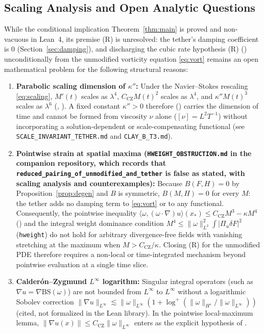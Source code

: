 \documentclass[11pt,a4paper]{article}
\theoremstyle{plain}
\theoremstyle{definition}
\theoremstyle{remark}
\newcommand{\CZ}{C_{\mathrm{CZ}}}
\begin{document}
\subsection{Scaling Analysis and Open Analytic Questions}\label{sec:obstruction}\label{sec:open}
While the conditional implication Theorem~\ref{thm:main} is proved and non-vacuous in Lean~4, its premise (R) is unresolved: the tether's damping coefficient is $0$ (Section~\ref{sec:damping}), and discharging the cubic rate hypothesis (R) () unconditionally from the unmodified vorticity equation \eqref{eq:vort} remains an open mathematical problem for the following structural reasons:
\begin{enumerate}
\item \textbf{Parabolic scaling dimension of $\kappa''$:} Under the Navier--Stokes rescaling \eqref{eq:scaling}, $M'(t)$ scales as $\lambda^4$, $\CZ M(t)^2$ scales as $\lambda^4$, and $\kappa'' M(t)^3$ scales as $\lambda^6$ (, ). A fixed constant $\kappa''>0$ therefore () carries the dimension of time and cannot be formed from viscosity $\nu$ alone ($[\nu]=L^2T^{-1}$) without incorporating a solution-dependent or scale-compensating functional (see \texttt{SCALE\_INVARIANT\_TETHER.md} and \texttt{CLAY\_B\_T3.md}).
\item \textbf{Pointwise strain at spatial maxima (\texttt{HWEIGHT\_OBSTRUCTION.md} in the companion repository, which records that \texttt{reduced\_pairing\_of\_unmodified\_and\_tether} is false as stated, with scaling analysis and counterexamples):} Because $B(F,H)=0$ by Proposition~\ref{prop:degen} and $B$ is symmetric, $B(M,H)=0$ for every $M$: the tether adds no damping term to \eqref{eq:vort} or to any functional. Consequently, the pointwise inequality $\langle\omega,(\omega\cdot\nabla)u\rangle(x_*)\le\CZ M^3-\kappa M^4$ () and the integral weight dominance condition $M^4\le\|\omega\|_{L^2}^2\int|\Pi_u\delta F|^2$ (\texttt{hweight}) do not hold for arbitrary divergence-free fields with vanishing stretching at the maximum when $M>\CZ/\kappa$. Closing (R) for the unmodified PDE therefore requires a non-local or time-integrated mechanism beyond pointwise evaluation at a single time slice.
\item \textbf{Calderón--Zygmund $L^\infty$ logarithm:} Singular integral operators (such as $\nabla u=\nabla\mathrm{BS}(\omega)$) are not bounded from $L^\infty$ to $L^\infty$ without a logarithmic Sobolev correction $\|\nabla u\|_{L^\infty}\lesssim \|\omega\|_{L^\infty}(1+\log^+(\|\omega\|_{H^s}/\|\omega\|_{L^\infty}))$ \cite{BKM1984} (cited, not formalized in the Lean library). In the pointwise local-maximum lemma, $\|\nabla u(x)\|\le\CZ\|\omega\|_{L^\infty}$ enters as the explicit hypothesis  of .
\end{enumerate}
\end{document}
